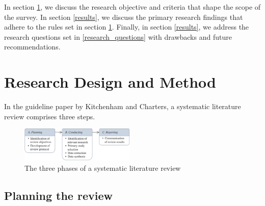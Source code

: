 \documentclass[conference]{IEEEtran}
\begin{document}

In section \ref{research_method}, we discuss the research objective and criteria that shape the scope of the survey. In section \ref{results}, we discuss the primary research findings that adhere to the rules set in section \ref{research_method}. Finally, in section \ref{results}, we address the research questions set in \ref{research_questions} with drawbacks and future recommendations.

\section{Research Design and Method}
\label{research_method}

In the guideline paper by Kitchenham and Charters\cite{GuidelinesPerformingSystematic}, a systematic literature review comprises three steps.

\begin{figure}[ht]
    \centering
    \includegraphics[width=0.489\textwidth]{images/systematic_review_diagram.png}
    \caption{The three phases of a systematic literature review\cite{GuidelinesPerformingSystematic}}
    \label{Fig:slr_diagram}
\end{figure}

\subsection{Planning the review}
\end{document}
